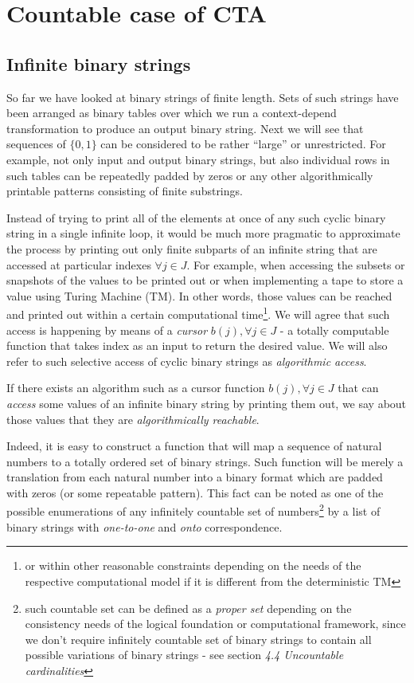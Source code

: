 \pagebreak
\section{Countable case of CTA}

\subsection{Infinite binary strings}

So far we have looked at binary strings of finite length. Sets of such strings have been arranged as binary tables over which we run a context-depend transformation to produce an output binary string. Next we will see that sequences of $\{0,1\}$ can be considered to be rather ``large'' or unrestricted. For example, not only input and output binary strings, but also individual rows in such tables can be repeatedly padded by zeros or any other algorithmically printable patterns consisting of finite substrings. 

Instead of trying to print all of the elements at once of any such cyclic binary string in a single infinite loop, it would be much more pragmatic to approximate the process by printing out only finite subparts of an infinite string that are accessed at particular indexes $\forall j \in J$. For example, when accessing the subsets or snapshots of the values to be printed out or when implementing a tape to store a value using Turing Machine (TM). In other words, those values can be reached and printed out within a certain computational time\footnote{or within other reasonable constraints depending on the needs of the respective computational model if it is different from the deterministic TM}. We will agree that such access is happening by means of a \textit{cursor} $b(j), \forall j \in J$ - a totally computable function that takes index as an input to return the desired value. We will also refer to such selective access of cyclic binary strings as \textit{algorithmic access}. 

\begin{definition}If there exists an algorithm such as a cursor function $b(j), \forall j \in J$ that can \textit{access} some values of an infinite binary string by printing them out, we say about those values that they are \textit{algorithmically reachable}.\end{definition}

Indeed, it is easy to construct a function that will map a sequence of natural numbers to a totally ordered set of binary strings. Such function will be merely a translation from each natural number into a binary format which are padded with zeros (or some repeatable pattern). This fact can be noted as one of the possible enumerations of any infinitely countable set of numbers\footnote{such countable set can be defined as a \textit{proper set} depending on the consistency needs of the logical foundation or computational framework, since we don't require infinitely countable set of binary strings to contain all possible variations of binary strings - see section \textit{4.4 Uncountable cardinalities}} by a list of binary strings with \textit{one-to-one} and \textit{onto} correspondence.

